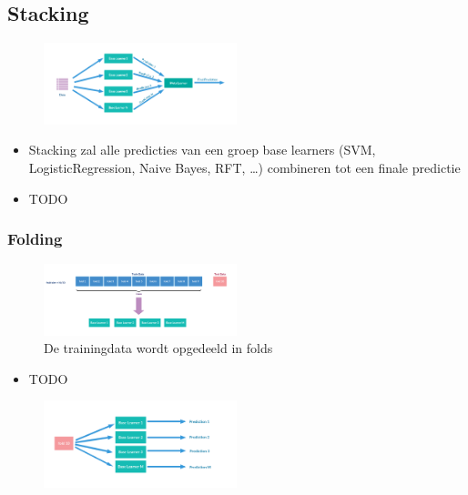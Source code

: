 \documentclass{article}
\begin{document}
\subsection{Stacking}

\begin{figure}[H]
    \centering
    \includegraphics[width=0.5\textwidth]{stacking.png}
    \caption{}
\end{figure}

\begin{itemize}
    \item Stacking zal alle predicties van een groep base learners (SVM, LogisticRegression, Naive Bayes, RFT, \dots) combineren tot een finale predictie
    \item TODO
\end{itemize}

\subsubsection{Folding}

\begin{figure}[H]
    \centering
    \includegraphics[width=0.5\textwidth]{stacking2.png}
    \caption{De trainingdata wordt opgedeeld in folds}
\end{figure}

\begin{itemize}
    \item TODO
\end{itemize}

\begin{figure}[H]
    \centering
    \includegraphics[width=0.5\textwidth]{stacking3.png}
    \caption{}
\end{figure}
\end{document}
